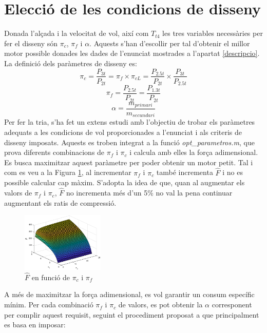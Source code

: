 \section{Elecció de les condicions de disseny}
Donada l'alçada i la velocitat de vol, així com $T_{t4}$ les tres variables necessàries per fer el disseny són $\pi_c$, $\pi_f$ i $\alpha$. Aquests s'han d'escollir per tal d'obtenir el millor motor possible donades les dades de l'enunciat mostrades a l'apartat \ref{descripcio}.
La definició dels paràmetres de disseny es:
\begin{equation*}
	\pi_c = \frac{P_{3t}}{P_{2t}} = \pi_{f}\times\pi_{cL} = \frac{P_{2.5t}}{P_{2t}} \times \frac{P_{3t}}{P_{2.5t}}
\end{equation*}
\begin{equation*}
	\pi_f = \frac{P_{2.5t}}{P_{2t}} = \frac{P_{1.3t}}{P_{2t}} 
\end{equation*}
\begin{equation*}
	\alpha = \frac{m_{primari}}{m_{secundari}}
\end{equation*}
\noindent Per fer la tria,  s'ha fet un extens estudi amb l'objectiu de trobar els paràmetres adequats a les condicions de vol proporcionades a l'enunciat i als criteris de disseny imposats. Aquests es troben integrat a la funció \textit{opt\_parametros.m}, que prova diferents combinacions de $\pi_f$ i $\pi_c$ i calcula amb elles la força adimensional. Es busca maximitzar aquest paràmetre per poder obtenir un motor petit. Tal i com es veu a la Figura \ref{Fadimensional}, al incrementar $\pi_f$ i $\pi_c$ també incrementa \(\hat{F}\) i no es possible calcular cap màxim. S'adopta la idea de que, quan al augmentar els valors de $\pi_f$ i $\pi_c$, \(\hat{F}\) no incrementa més d'un 5\% no val la pena continuar augmentant els ratis de compressió.
\begin{figure}[H]
	\centering
	\includegraphics[width=0.35\textwidth]{./pics/F_pc_pf}
	\caption{\(\hat{F}\) en funció de $\pi_c$ i $\pi_f$}
	\label{Fadimensional}
\end{figure}
A més de maximitzar la força adimensional, es vol garantir un consum específic mínim. Per cada combinació  $\pi_f$ i $\pi_c$ de valors, es pot obtenir la $\alpha$ corresponent per complir aquest requisit, seguint el procediment proposat a \cite[5-10]{mattingly} que principalment es basa en imposar:

